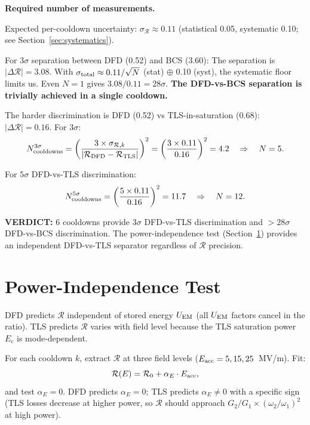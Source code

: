 \documentclass[11pt]{article}
\newcommand{\verdict}[1]{\textcolor{green!50!black}{\textbf{VERDICT:} #1}}
\theoremstyle{definition}
\theoremstyle{remark}
\begin{document}
\textbf{Required number of measurements.}

Expected per-cooldown uncertainty: $\sigma_{\mathcal{R}} \approx 0.11$
(statistical 0.05, systematic 0.10; see Section~\ref{sec:systematics}).

For $3\sigma$ separation between DFD (0.52) and BCS (3.60):
The separation is $|\Delta\mathcal{R}| = 3.08$. With
$\sigma_{\rm total} \approx 0.11/\sqrt{N}$ (stat) $\oplus$ 0.10
(syst), the systematic floor limits us. Even $N = 1$ gives
$3.08/0.11 = 28\sigma$. \textbf{The DFD-vs-BCS separation is
trivially achieved in a single cooldown.}

The harder discrimination is DFD (0.52) vs TLS-in-saturation (0.68):
$|\Delta\mathcal{R}| = 0.16$. For $3\sigma$:
\begin{equation}
N_{\rm cooldowns}^{3\sigma} = \left(
\frac{3 \times \sigma_{\mathcal{R},k}}
{|\mathcal{R}_{\rm DFD} - \mathcal{R}_{\rm TLS}|}
\right)^2
= \left(\frac{3 \times 0.11}{0.16}\right)^2 = 4.2
\quad \Rightarrow \quad N = 5.
\end{equation}

For $5\sigma$ DFD-vs-TLS discrimination:
\begin{equation}
N_{\rm cooldowns}^{5\sigma}
= \left(\frac{5 \times 0.11}{0.16}\right)^2 = 11.7
\quad \Rightarrow \quad N = 12.
\end{equation}

\verdict{6 cooldowns provide $3\sigma$ DFD-vs-TLS discrimination
and $> 28\sigma$ DFD-vs-BCS discrimination. The power-independence
test (Section~\ref{sec:power-test}) provides an independent
DFD-vs-TLS separator regardless of $\mathcal{R}$ precision.}


\section{Power-Independence Test}
\label{sec:power-test}

DFD predicts $\mathcal{R}$ independent of stored energy $U_{\rm EM}$
(all $U_{\rm EM}$ factors cancel in the ratio). TLS predicts
$\mathcal{R}$ varies with field level because the TLS saturation
power $E_c$ is mode-dependent.

For each cooldown $k$, extract $\mathcal{R}$ at three field levels
($E_{\rm acc} = 5, 15, 25$~MV/m). Fit:
\begin{equation}
\mathcal{R}(E) = \mathcal{R}_0 + \alpha_E \cdot E_{\rm acc},
\end{equation}
and test $\alpha_E = 0$. DFD predicts $\alpha_E = 0$; TLS predicts
$\alpha_E \neq 0$ with a specific sign (TLS losses decrease at
higher power, so $\mathcal{R}$ should approach $G_2/G_1 \times
(\omega_2/\omega_1)^2$ at high power).
\end{document}
